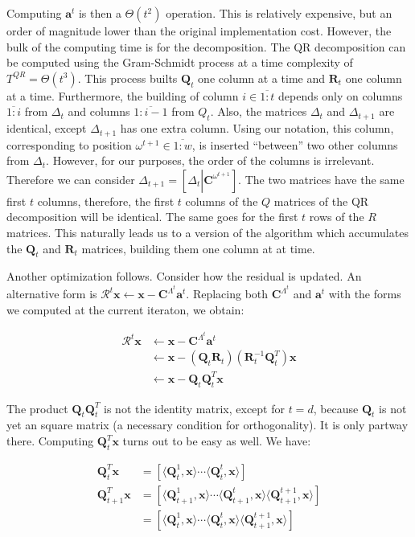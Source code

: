 \documentclass[12pt,a4paper,oneside,english]{UPBThesis}
\newcommand{\hcrange}[2]{\overline{{#1}\colon\!\!{#2}}}
\begin{document}
Computing $\textbf{a}^t$ is then a $\Theta(t^2)$ operation. This is relatively expensive, but an order of magnitude lower than the original implementation cost. However, the bulk of the computing time is for the decomposition. The QR decomposition can be computed using the Gram-Schmidt process at a time complexity of $T^{QR} = \Theta(t^3)$. This process builts $\textbf{Q}_t$ one column at a time and $\textbf{R}_t$ one column at a time. Furthermore, the building of column $i \in \hcrange{1}{t}$ depends only on columns $\hcrange{1}{i}$ from $\Delta_t$ and columns $\hcrange{1}{i-1}$ from $Q_t$. Also, the matrices $\Delta_t$ and $\Delta_{t+1}$ are identical, except $\Delta_{t+1}$ has one extra column. Using our notation, this column, corresponding to position $\omega^{t+1} \in \hcrange{1}{w}$, is inserted ``between'' two other columns from $\Delta_t$. However, for our purposes, the order of the columns is irrelevant. Therefore we can consider $\Delta_{t+1} = \left[\Delta_t \left|\right. \textbf{C}^{\omega^{t+1}} \right]$. The two matrices have the same first $t$ columns, therefore, the first $t$ columns of the $Q$ matrices of the QR decomposition will be identical. The same goes for the first $t$ rows of the $R$ matrices. This naturally leads us to a version of the algorithm which accumulates the $\textbf{Q}_t$ and $\textbf{R}_t$ matrices, building them one column at at time.

Another optimization follows. Consider how the residual is updated. An alternative form is $\mathcal{R}^t\textbf{x} \gets \textbf{x} - \textbf{C}^{\Lambda^t}\textbf{a}^t$. Replacing both $\textbf{C}^{\Lambda^t}$ and $\textbf{a}^t$ with the forms we computed at the current iteraton, we obtain:

\begin{align*}
\mathcal{R}^t\textbf{x} & \gets \textbf{x} - \textbf{C}^{\Lambda^t}\textbf{a}^t \\
& \gets \textbf{x} - (\textbf{Q}_t\textbf{R}_t)(\textbf{R}_t^{-1}\textbf{Q}_t^T)\textbf{x} \\
& \gets \textbf{x} - \textbf{Q}_t\textbf{Q}_t^T\textbf{x}
\end{align*}

The product $\textbf{Q}_t\textbf{Q}_t^T$ is not the identity matrix, except for $t = d$, because $\textbf{Q}_t$ is not yet an square matrix (a necessary condition for orthogonality). It is only partway there. Computing $\textbf{Q}_t^T\textbf{x}$ turns out to be easy as well. We have:

\begin{align*}
\textbf{Q}_t^T\textbf{x} & = [ \langle \textbf{Q}_t^1, \textbf{x} \rangle \cdots \langle \textbf{Q}_t^t, \textbf{x} \rangle ] \\
\textbf{Q}_{t+1}^T\textbf{x} & = [ \langle \textbf{Q}_{t+1}^1, \textbf{x} \rangle \cdots \langle \textbf{Q}_{t+1}^t, \textbf{x} \rangle \langle \textbf{Q}_{t+1}^{t+1}, \textbf{x} \rangle ] \\
& = [ \langle \textbf{Q}_t^1, \textbf{x} \rangle \cdots \langle \textbf{Q}_t^t, \textbf{x} \rangle \langle \textbf{Q}_{t+1}^{t+1}, \textbf{x} \rangle] \\
\end{align*}
\end{document}
